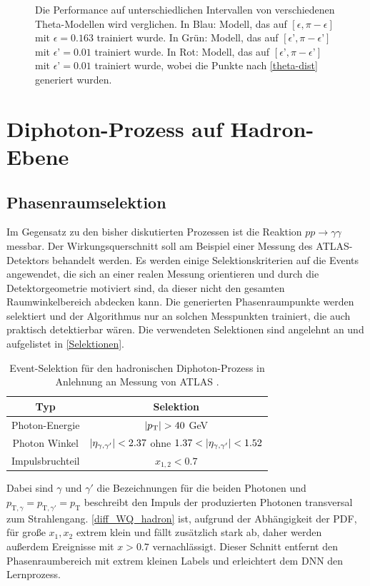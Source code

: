 \begin{figure}[h]
	\caption{Die Performance auf unterschiedlichen Intervallen von verschiedenen Theta-Modellen wird verglichen. In Blau: Modell, das auf ${[\epsilon, \pi - \epsilon]}$ mit $\epsilon = 0.163$ trainiert wurde. In Grün: Modell, das auf ${[\epsilon’, \pi - \epsilon’]}$ mit $\epsilon’=0.01$ trainiert wurde. In Rot: Modell, das auf ${[\epsilon’, \pi - \epsilon’]}$ mit $\epsilon’=0.01$ trainiert wurde, wobei die Punkte nach \textsf{\autoref{theta-dist}} generiert wurden.}
	\label{theta-comparison}
\end{figure}
\section{Diphoton-Prozess auf Hadron-Ebene}
\subsection{Phasenraumselektion}
Im Gegensatz zu den bisher diskutierten Prozessen ist die Reaktion $pp \rightarrow \gamma \gamma$ messbar. Der Wirkungsquerschnitt soll am Beispiel einer Messung des ATLAS-Detektors behandelt werden. Es werden einige Selektionskriterien auf die Events angewendet, die sich an einer realen Messung orientieren und durch die Detektorgeometrie motiviert sind, da dieser nicht den gesamten Raumwinkelbereich abdecken kann. Die generierten Phasenraumpunkte werden selektiert und der Algorithmus nur an solchen Messpunkten trainiert, die auch praktisch detektierbar wären. Die verwendeten Selektionen sind angelehnt an \cite{Cuts-Paper} und aufgelistet in \textsf{\autoref{Selektionen}}.
\begin{table}[bp]
	\centering
	\caption{Event-Selektion für den hadronischen Diphoton-Prozess in Anlehnung an Messung von ATLAS \cite{Cuts-Paper}.}
	\begin{tabular}{|c|c|}
		\hline
		Typ & Selektion \\
		\hline
		Photon-Energie & $\abs{p_\text{T}} > 40$ GeV \\
		Photon Winkel & $\abs{\eta_{\gamma, \gamma'}} < 2.37$ ohne $1.37 < \abs{\eta_{\gamma, \gamma'}} < 1.52$ \\
		Impulsbruchteil & $x_{1,2} < 0.7 $\\
		\hline
	\end{tabular}
	\label{Selektionen}
\end{table}
Dabei sind $\gamma$ und ${\gamma'}$ die Bezeichnungen für die beiden Photonen und $p_{\text{T},\gamma} = p_{\text{T},\gamma'} = p_\text{T}$ beschreibt den Impuls der produzierten Photonen transversal zum Strahlengang. \textsf{\autoref{diff_WQ_hadron}} ist, aufgrund der Abhängigkeit der PDF, für große $x_1, x_2$ extrem klein und fällt zusätzlich stark ab, daher werden außerdem Ereignisse mit $x > 0.7$ vernachlässigt. Dieser Schnitt entfernt den Phasenraumbereich mit extrem kleinen Labels und erleichtert dem DNN den Lernprozess. 


